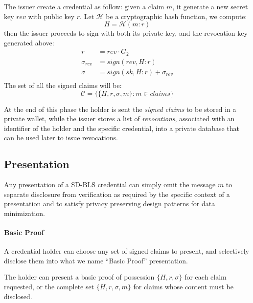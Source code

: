 The issuer create a credential as follow: given a claim $m$, it
generate a new secret key $rev$ with public key $r$. Let $\mathcal{H}$
be a cryptographic hash function, we compute:
\begin{equation*}
    H = \mathcal{H}(m : r)
\end{equation*}
then the issuer proceeds to sign with both its private key, and the
revocation key generated above:
\begin{equation*}\label{rev_agg}
    \begin{split}
        r &= rev \cdot G_2 \\
        \sigma_{rev} &= sign(rev, H : r)\\
        \sigma &= sign(sk, H : r) + \sigma_{rev}\\
   \end{split}
\end{equation*}
The set of all the signed claims will be:
\begin{equation*}
   \mathcal{C} = \big\{ \{H, r, \sigma, m \} : m\in claims  \big\}
\end{equation*}

At the end of this phase the holder is sent the \textit{signed claims}
to be stored in a private wallet, while the issuer stores a list of
\textit{revocations}, associated with an identifier of the holder and
the specific credential, into a private database that can be used
later to issue revocations.



\subsection{Presentation} \label{presentation}

Any presentation of a SD-BLS credential can simply omit the message
$m$ to separate disclosure from verification as required by the
specific context of a presentation and to satisfy privacy preserving
design patterns for data minimization.

\paragraph{Basic Proof}

A credential holder can choose any set of signed claims to present,
and selectively disclose them into what we name ``Basic Proof''
presentation.

The holder can present a basic proof of possession $\{ H, r, \sigma
\}$ for each claim requested, or the complete set $\{ H, r, \sigma, m
\}$ for claims whose content must be disclosed.

